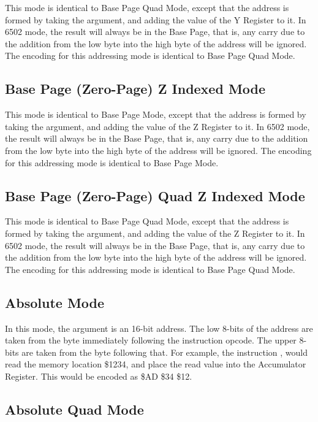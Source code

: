 This mode is identical to Base Page Quad Mode, except that the address is formed by taking the
argument, and adding the value of the Y Register to it.  In 6502 mode, the result will always
be in the Base Page, that is, any carry due to the addition from the low byte into the high byte
of the address will be ignored.  The encoding for this addressing mode is identical to Base Page Quad
Mode.

\subsection{Base Page (Zero-Page) Z Indexed Mode}

This mode is identical to Base Page Mode, except that the address is formed by taking the
argument, and adding the value of the Z Register to it.  In 6502 mode, the result will always
be in the Base Page, that is, any carry due to the addition from the low byte into the high byte
of the address will be ignored.  The encoding for this addressing mode is identical to Base Page
Mode.

\subsection{Base Page (Zero-Page) Quad Z Indexed Mode}

This mode is identical to Base Page Quad Mode, except that the address is formed by taking the
argument, and adding the value of the Z Register to it.  In 6502 mode, the result will always
be in the Base Page, that is, any carry due to the addition from the low byte into the high byte
of the address will be ignored.  The encoding for this addressing mode is identical to Base Page Quad
Mode.

\subsection{Absolute Mode}

In this mode, the argument is an 16-bit address.  The low 8-bits of the address are taken from
the byte immediately following the instruction opcode. The upper 8-bits are taken from the
byte following that.  For example, the instruction , would read the
memory location \$1234, and place the read value into the Accumulator Register.  This would
be encoded as \$AD \$34 \$12.

\subsection{Absolute Quad Mode}

